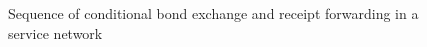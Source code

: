 \begin{figure}
\begin{tikzpicture}[every node/.style={font=\normalsize,
  minimum height=.7cm,minimum width=1.5cm},]
\end{tikzpicture}
\caption{Sequence of conditional bond exchange and receipt forwarding in a service network}
\label{fig:svcnets-sequence-diagram}
\end{figure}